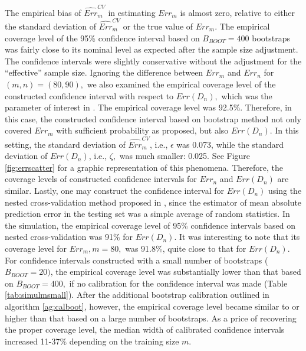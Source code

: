 \documentclass[12pt]{article}
\begin{document}
The empirical bias of $\widehat{Err}_m^{CV}$ in estimating $Err_m$ is almost zero,  relative to either the standard deviation of $\widehat{Err}_m^{CV}$ or the true value of $Err_m.$ The empirical coverage level of the 95\% confidence interval based on $B_{BOOT}=400$ bootstraps was fairly close to its nominal level as expected after the sample size adjustment.  The confidence intervals were slightly conservative without the adjustment for the ``effective'' sample size.  Ignoring the difference between $Err_m$ and $Err_n$ for $(m, n)=(80, 90),$  we also examined the empirical coverage level of the constructed confidence interval with respect to $Err(D_n),$ which was the parameter of interest in \cite{bates2021cross}. The empirical coverage level was 92.5\%.  Therefore, in this case, the constructed confidence interval based on bootstrap method not only covered $Err_m$ with sufficient probability as proposed, but also $Err(D_n)$. In this setting, the standard deviation of $\widehat{Err}_m^{CV}$, i.e., $\epsilon$ was 0.073, while the standard deviation of $Err(D_n)$, i.e., $\zeta,$ was much smaller: 0.025.  See Figure \ref{fig:errscatter} for a graphic representation of this phenomena. Therefore, the coverage levels of constructed confidence intervals for $Err_n$ and $Err(D_n)$ are similar.  Lastly, one may construct the confidence interval for $Err(D_n)$ using the nested cross-validation method proposed in \cite{bates2021cross}, since the estimator of mean absolute prediction error in the testing set was a simple average of random statistics. In the simulation, the empirical coverage level of 95\% confidence intervals based on nested cross-validation was 91\% for $Err(D_n)$. It was interesting to note that its coverage level for $Err_{m}, m=80,$ was 91.8\%, quite close to that for $Err(D_n).$   For confidence intervals constructed with a small number of bootstraps ($B_{BOOT}=20)$, the empirical coverage level was substantially lower than that based on $B_{BOOT}=400,$ if no calibration for the confidence interval was made (Table \ref{tab:simulmsmall}). After the additional bootstrap calibration outlined in algorithm \ref{ag:calboot}, however, the empirical coverage level became similar to or higher than that based on a large number of bootstraps. As a price of recovering the proper coverage level, the median width of calibrated confidence intervals increased  11-37\% depending on the training size $m.$
\end{document}
